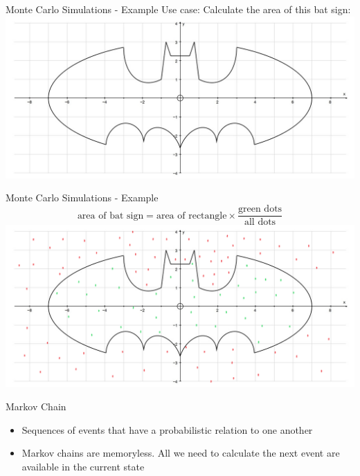 \documentclass[12pt, aspectratio=149]{beamer}
\theoremstyle{plain}
\begin{document}
\begin{frame}[fragile]{Monte Carlo Simulations - Example}
Use case: Calculate the area of this bat sign:
\includegraphics[scale=0.3]{figs/bat_signal.png}
\end{frame}

\begin{frame}[fragile]{Monte Carlo Simulations - Example}
\begin{equation} \textrm{area of bat sign} = \textrm{area of rectangle} \times \frac{\textrm{green dots}}{\textrm{all dots}}\end{equation}
\includegraphics[scale=0.3]{figs/bat_signal_mcs.png}
\end{frame}


\begin{frame}[fragile]{Markov Chain}
\begin{itemize}
\item Sequences of events that have a probabilistic relation to one another
\item Markov chains are memoryless. All we need to calculate the next event are available in the current state
\end{itemize}
\end{frame}
\end{document}
